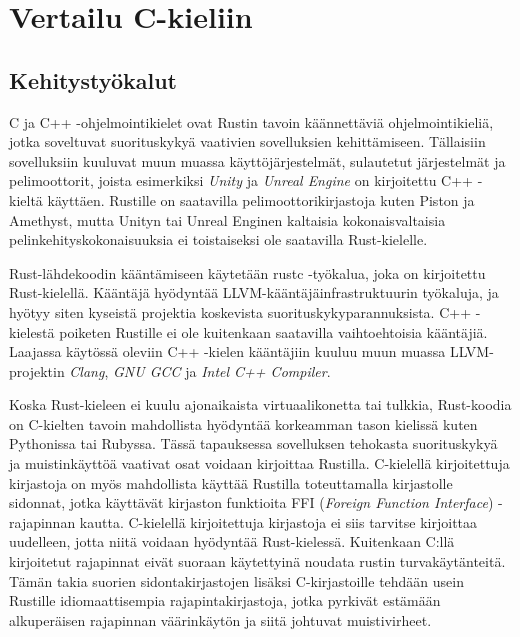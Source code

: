 \documentclass[finnish]{tktltiki2}
\theoremstyle{definition}
\theoremstyle{remark}
\begin{document}
\section{Vertailu C-kieliin}

\subsection{Kehitystyökalut}

C ja C++ -ohjelmointikielet ovat Rustin tavoin käännettäviä ohjelmointikieliä, jotka soveltuvat suorituskykyä vaativien sovelluksien kehittämiseen. Tällaisiin sovelluksiin kuuluvat muun muassa käyttöjärjestelmät, sulautetut järjestelmät ja pelimoottorit, joista esimerkiksi \textit{Unity} ja \textit{Unreal Engine} on kirjoitettu C++ -kieltä käyttäen. Rustille on saatavilla pelimoottorikirjastoja kuten Piston ja Amethyst, mutta Unityn tai Unreal Enginen kaltaisia kokonaisvaltaisia pelinkehityskokonaisuuksia ei toistaiseksi ole saatavilla Rust-kielelle.\cite{AreWeGameYetEngines}

Rust-lähdekoodin kääntämiseen käytetään rustc -työkalua, joka on kirjoitettu Rust-kielellä. Kääntäjä hyödyntää LLVM-kääntäjäinfrastruktuurin työkaluja, ja hyötyy siten kyseistä projektia koskevista suorituskykyparannuksista. \cite{RustFaq} C++ -kielestä poiketen Rustille ei ole kuitenkaan saatavilla vaihtoehtoisia kääntäjiä. Laajassa käytössä oleviin C++ -kielen kääntäjiin kuuluu muun muassa LLVM-projektin \textit{Clang}, \textit{GNU GCC} ja \textit{Intel C++ Compiler}.

Koska Rust-kieleen ei kuulu ajonaikaista virtuaalikonetta tai tulkkia, Rust-koodia on C-kielten tavoin mahdollista hyödyntää korkeamman tason kielissä kuten Pythonissa tai Rubyssa. Tässä tapauksessa sovelluksen tehokasta suorituskykyä ja muistinkäyttöä vaativat osat voidaan kirjoittaa Rustilla.\cite{RustInsideOtherLanguages} C-kielellä kirjoitettuja kirjastoja on myös mahdollista käyttää Rustilla toteuttamalla kirjastolle sidonnat, jotka käyttävät kirjaston funktioita FFI (\textit{Foreign Function Interface}) -rajapinnan kautta. C-kielellä kirjoitettuja kirjastoja ei siis tarvitse kirjoittaa uudelleen, jotta niitä voidaan hyödyntää Rust-kielessä. Kuitenkaan C:llä kirjoitetut rajapinnat eivät suoraan käytettyinä noudata rustin turvakäytänteitä. Tämän takia suorien sidontakirjastojen lisäksi C-kirjastoille tehdään usein Rustille idiomaattisempia rajapintakirjastoja, jotka pyrkivät estämään alkuperäisen rajapinnan väärinkäytön ja siitä johtuvat muistivirheet.
\end{document}
